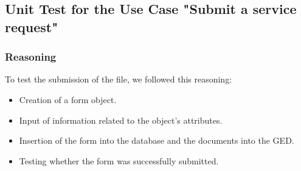 \subsection{ Unit Test for the Use Case "Submit a service request"}
\subsubsection{Reasoning} 
To test the submission of the file, we followed this reasoning:\\  
\begin{itemize}
    \item Creation of a form object.  
   \item Input of information related to the object's attributes.  
\item Insertion of the form into the database and the documents into the GED.  
\item Testing whether the form was successfully submitted.
\end{itemize}
